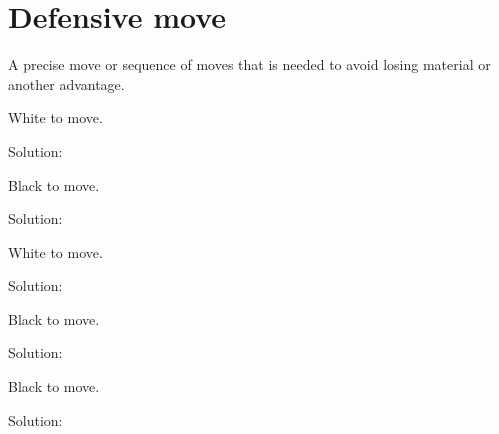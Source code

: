 \documentclass{book}
\begin{document}
\section{Defensive move}
A precise move or sequence of moves that is needed to avoid losing material or another advantage.\begin{multicols}{2} 
\begin{samepage} 
\newgame 


 
\showboard
 
 White to move. 
 
Solution: 
 
\end{samepage}\begin{samepage} 
\newgame 


 
\showboard
 
 Black to move. 
 
Solution: 
 
\end{samepage}\begin{samepage} 
\newgame 


 
\showboard
 
 White to move. 
 
Solution: 
 
\end{samepage}\begin{samepage} 
\newgame 


 
\showboard
 
 Black to move. 
 
Solution: 
 
\end{samepage}\begin{samepage} 
\newgame 


 
\showboard
 
 Black to move. 
 
Solution: 
 
\end{samepage}\end{multicols} 
\newpage 
\end{document}
